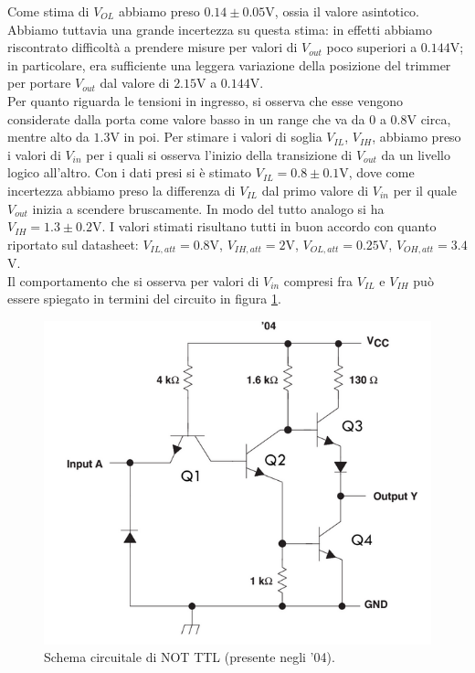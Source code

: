 \documentclass[10pt,a4paper]{article}
\begin{document}
Come stima di $V_{OL}$ abbiamo preso $0.14 \pm 0.05$V, ossia il valore asintotico. Abbiamo tuttavia una grande incertezza su questa stima: in effetti abbiamo riscontrato difficoltà a prendere misure per valori di $V_{out}$ poco superiori a $0.144$V; in particolare, era sufficiente una leggera variazione della posizione del trimmer per portare $V_{out}$ dal valore di $2.15$V a $0.144$V.\\
Per quanto riguarda le tensioni in ingresso, si osserva che esse vengono considerate dalla porta come valore basso in un range che va da $0$ a $0.8$V circa, mentre alto da $1.3$V in poi.
Per stimare i valori di soglia $V_{IL}$, $V_{IH}$, abbiamo preso i valori di $V_{in}$ per i quali si osserva l'inizio della transizione di $V_{out}$ da un livello logico all'altro. Con i dati presi si è stimato $V_{IL} = 0.8\pm 0.1$V, dove come incertezza abbiamo preso la differenza di $V_{IL}$ dal primo valore di $V_{in}$ per il quale $V_{out}$ inizia a scendere bruscamente.
In modo del tutto analogo si ha $V_{IH} = 1.3\pm 0.2$V. 
I valori stimati risultano tutti in buon accordo con quanto riportato sul datasheet:
$V_{IL,att}= 0.8$V, $V_{IH, att}=2$V, $V_{OL, att}=0.25$V, $V_{OH, att}=3.4$V.\\
Il comportamento che si osserva per valori di $V_{in}$ compresi fra $V_{IL}$ e $V_{IH}$ può essere spiegato in termini del circuito in figura \ref{fig:ttl}.

\begin{figure}
\centering
\includegraphics[scale=0.6]{ttl.png}
\caption{Schema circuitale di NOT TTL (presente negli '04).\label{fig:ttl}}
\end{figure}
\end{document}
